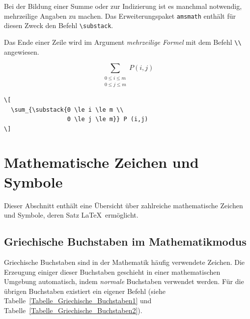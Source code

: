 \documentclass[a4paper,10pt,twoside]{scrbook}
\begin{document}
Bei der Bildung einer Summe oder zur Indizierung ist 
es manchmal notwendig, mehrzeilige Angaben 
zu machen. Das Erweiterungspaket \verb!amsmath! enthält für diesen Zweck
den Befehl \verb!\substack!.  


Das Ende einer Zeile wird im 
Argument \textsl{mehrzeilige Formel}
mit dem Befehl \verb!\\! angewiesen.


\begin{minipage}[c]{.4\textwidth}
\setlength{\parskip}{1em}
\[
  \sum_{\substack{0 \le i \le m \\
                  0 \le j \le m}} P (i,j)
\]
\end{minipage}
\hfill
\begin{minipage}[c]{.58\textwidth}
\setlength{\parskip}{1em}
\begin{lstlisting}[label=substackbeispiel, style=customlatex]
\[
  \sum_{\substack{0 \le i \le m \\
                  0 \le j \le m}} P (i,j)
\]
\end{lstlisting}
\end{minipage}

\section{Mathematische Zeichen und Symbole}

Dieser Abschnitt enthält eine Übersicht über zahlreiche 
mathematische Zeichen und Symbole, deren Satz \LaTeX\ ermöglicht.


\subsection{Griechische Buchstaben im Mathematikmodus} 

Griechische Buchstaben sind in der
Mathematik häufig verwendete Zeichen. Die Erzeugung einiger dieser
Buchstaben geschieht in einer mathematischen Umgebung automatisch, indem \textsl{normale} 
Buchstaben verwendet werden. Für die übrigen Buchstaben existiert ein eigener Befehl 
(siehe Tabelle~\ref{Tabelle_Griechische_Buchstaben1} und Tabelle~\ref{Tabelle_Griechische_Buchstaben2}). 
\end{document}
